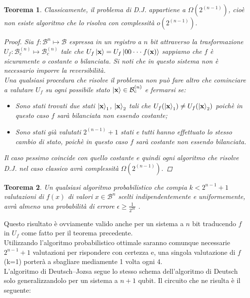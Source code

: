\documentclass[12pt,a4paper,openright]{report}
\newtheorem{mythm}{Teorema}[chapter]
\begin{document}
\begin{mythm}
 Classicamente, il problema di D.J. appartiene a $\Omega(2^{(n-1)})$, cioè non esiste algoritmo che lo risolva con complessità $o(2^{(n-1)})$.
 \begin{proof}
     Sia $f:\mathcal{B}^n\mapsto\mathcal{B}$ espressa in un registro a $n$ bit attraverso la trasformazione $U_f: \mathcal{B}_c^{(n)} \mapsto \mathcal{B}_c^{(n)}$ tale che $U_f\ket{\textbf{x}}=U_f\ket{00\cdot\cdot\cdot f(\textbf{x})}$ sappiamo che $f$ è sicuramente o costante o bilanciata.
     Si noti che in questo sistema non è necessario imporre la reversibilità.\\
     Una qualsiasi procedura che risolve il problema non può fare altro che cominciare a valutare $U_f$ su ogni possibile stato $\ket{\textbf{x}}\in{\mathcal{B}_c^{(n)}}$ e fermarsi se:
     \begin{itemize}
         \item Sono stati trovati due stati $\ket{\textbf{x}}_1$, $\ket{\textbf{x}}_2$ tali che $U_f(\ket{\textbf{x}}_1) \ne U_f(\ket{\textbf{x}}_2)$ poichè in questo caso $f$ sarà bilanciata non essendo costante;
         \item Sono stati già valutati $2^{(n-1)}+1$ stati e tutti hanno effettuato lo stesso cambio di stato, poichè in questo caso $f$ sarà costante non essendo bilanciata.
     \end{itemize} 
     Il caso pessimo coincide con quello costante e quindi ogni algoritmo che risolve D.J. nel caso classico avrà complessità $\Omega(2^{(n-1)})$.
 \end{proof}
\end{mythm}

\begin{mythm}
    Un qualsiasi algoritmo probabilistico che compia $k<2^{n-1}+1$ valutazioni di $f(x)$ di valori $x\in\mathcal{B}^n$ scelti indipendentemente e uniformemente, avrà almeno una probabilità di errore $\epsilon \geq \frac{1}{2^{2k}}$ \cite{ref17}. 
\end{mythm}
Questo risultato è ovviamente valido anche per un sistema a $n$ bit traducendo $f$ in $U_f$ come fatto per il teorema precedente.\\
Utilizzando l'algoritmo probabilistico ottimale saranno comunque necessarie $2^{n-1} + 1$ valutazioni per rispondere con certezza e, una singola valutazione di $f$ (k=1) porterà a sbagliare mediamente 1 volta ogni 4.\\

\newpage
L'algoritmo di Deutsch–Jozsa segue lo stesso schema dell'algoritmo di Deutsch solo generalizzandolo per un sistema a $n+1$ qubit. Il circuito che ne risulta è il seguente:
\end{document}
